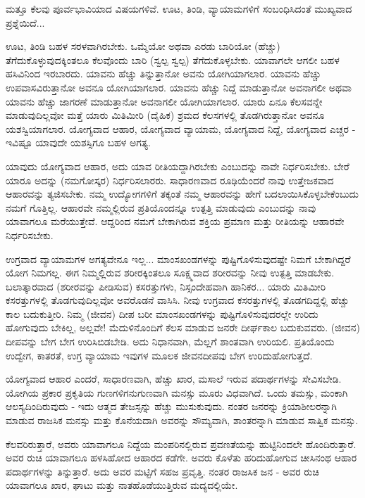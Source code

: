ಮತ್ತೂ ಕೆಲವು ಪೂರ್ವಭಾವಿಯಾದ ವಿಷಯಗಳಿವೆ. ಊಟ, ತಿಂಡಿ, ವ್ಯಾಯಾಮಗಳಿಗೆ ಸಂಬಂಧಿಸಿದಂತೆ ಮುಖ್ಯವಾದ ಪ್ರಶ್ನೆಯಿದೆ...

ಊಟ, ತಿಂಡಿ ಬಹಳ ಸರಳವಾಗಿರಬೇಕು. ಒಮ್ಮೆಯೋ ಅಥವಾ ಎರಡು ಬಾರಿಯೋ (ಹೆಚ್ಚು) ತೆಗೆದುಕೊಳ್ಳುವುದಕ್ಕಿಂತಲೂ ಕೆಲವೊಂದು ಬಾರಿ (ಸ್ವಲ್ಪ ಸ್ವಲ್ಪ) ತೆಗೆದುಕೊಳ್ಳಬೇಕು. ಯಾವಾಗಲೇ ಆಗಲೀ ಬಹಳ ಹಸಿವಿನಿಂದ ಇರಬಾರದು. ಯಾವನು ಹೆಚ್ಚು ತಿನ್ನುತ್ತಾನೋ ಅವನು ಯೋಗಿಯಾಗಲಾರ. ಯಾವನು ಹೆಚ್ಚು ಉಪವಾಸವಿರುತ್ತಾನೋ ಅವನೂ ಯೋಗಿಯಾಗಲಾರ. ಯಾವನು ಹೆಚ್ಚು ನಿದ್ದೆ ಮಾಡುತ್ತಾನೋ ಅವನಾಗಲೀ ಅಥವಾ ಯಾವನು ಹೆಚ್ಚು ಜಾಗರಣೆ ಮಾಡುತ್ತಾನೋ ಅವನಾಗಲೀ ಯೋಗಿಯಾಗಲಾರ. ಯಾರು ಏನೂ ಕೆಲಸವನ್ನೇ ಮಾಡುವುದಿಲ್ಲವೋ ಮತ್ತೆ ಯಾರು ಮಿತಿಮೀರಿ (ದೈಹಿಕ) ಶ್ರಮದ ಕೆಲಸಗಳಲ್ಲಿ ತೊಡಗಿರುತ್ತಾನೋ ಅವನೂ ಯಶಸ್ವಿಯಾಗಲಾರ. ಯೋಗ್ಯವಾದ ಆಹಾರ, ಯೋಗ್ಯವಾದ ವ್ಯಾಯಾಮ, ಯೋಗ್ಯವಾದ ನಿದ್ದೆ, ಯೋಗ್ಯವಾದ ಎಚ್ಚರ - ಇವಿಷ್ಟೂ ಯಾವುದೇ ಯಶಸ್ಸಿಗೂ ಬಹಳ ಅಗತ್ಯ.

ಯಾವುದು ಯೋಗ್ಯವಾದ ಆಹಾರ, ಅದು ಯಾವ ರೀತಿಯದ್ದಾಗಿರಬೇಕು ಎಂಬುದನ್ನು ನಾವೇ ನಿರ್ಧರಿಸಬೇಕು. ಬೇರೆ ಯಾರೂ ಅದನ್ನು (ನಮಗೋಸ್ಕರ) ನಿರ್ಧರಿಸಲಾರರು. ಸಾಧಾರಣವಾದ ರೂಢಿಯೆಂದರೆ ನಾವು ಉತ್ತೇಜಕವಾದ ಆಹಾರವನ್ನು ತ್ಯಜಿಸಬೇಕು. ನಮ್ಮ ಉದ್ಯೋಗಗಳಿಗೆ ತಕ್ಕಂತೆ ನಮ್ಮ ಆಹಾರವನ್ನು ಹೇಗೆ ಬದಲಾಯಿಸಿಕೊಳ್ಳಬೇಕೆಂಬುದು ನಮಗೆ ಗೊತ್ತಿಲ್ಲ. ಆಹಾರವೇ ನಮ್ಮಲ್ಲಿರುವ ಪ್ರತಿಯೊಂದನ್ನೂ ಉತ್ಪತ್ತಿ ಮಾಡುವುದು ಎಂಬುದನ್ನು ನಾವು ಯಾವಾಗಲೂ ಮರೆಯುತ್ತೇವೆ. ಆದ್ದರಿಂದ ನಮಗೆ ಬೇಕಾಗಿರುವ ಶಕ್ತಿಯ ಪ್ರಮಾಣ ಮತ್ತು ರೀತಿಯನ್ನು ಆಹಾರವೇ ನಿರ್ಧರಿಸಬೇಕು.

ಉಗ್ರವಾದ ವ್ಯಾಯಾಮಗಳ ಅಗತ್ಯವೇನೂ ಇಲ್ಲ... ಮಾಂಸಖಂಡಗಳನ್ನು ಪುಷ್ಟಿಗೊಳಿಸುವುದಷ್ಟೇ ನಿಮಗೆ ಬೇಕಾಗಿದ್ದರೆ ಯೋಗ ನಿಮಗಲ್ಲ. ಈಗ ನಿಮ್ಮಲ್ಲಿರುವ ಶರೀರಕ್ಕಿಂತಲೂ ಸೂಕ್ಷ್ಮವಾದ ಶರೀರವನ್ನು ನೀವು ಉತ್ಪತ್ತಿ ಮಾಡಬೇಕು. ಬಲಾತ್ಕಾರವಾದ (ಶರೀರವನ್ನು ಪೀಡಿಸುವ) ಕಸರತ್ತುಗಳು, ನಿಸ್ಸಂದೇಹವಾಗಿ ಹಾನಿಕರ... ಯಾರು ಮಿತಿಮೀರಿ ಕಸರತ್ತುಗಳಲ್ಲಿ ತೊಡಗುವುದಿಲ್ಲವೋ ಅವರೊಡನೆ ವಾಸಿಸಿ. ನೀವು ಉಗ್ರವಾದ ಕಸರತ್ತುಗಳಲ್ಲಿ ತೊಡಗದಿದ್ದಲ್ಲಿ ಹೆಚ್ಚು ಕಾಲ ಬದುಕುತ್ತೀರಿ. ನಿಮ್ಮ (ಜೀವನ) ದೀಪ ಬರೀ ಮಾಂಸಖಂಡಗಳನ್ನು ಪುಷ್ಟಿಗೊಳಿಸುವುದರಲ್ಲೇ ಉರಿದು ಹೋಗುವುದು ಬೇಕಿಲ್ಲ, ಅಲ್ಲವೇ! ಮೆದುಳಿನೊಂದಿಗೆ ಕೆಲಸ ಮಾಡುವ ಜನರೇ ದೀರ್ಘಕಾಲ ಬದುಕುವವರು. (ಜೀವನ) ದೀಪವನ್ನು ಬೇಗ ಬೇಗ ಉರಿಸಿಬಿಡಬೇಡಿ. ಅದು ನಿಧಾನವಾಗಿ, ಮೆಲ್ಲಗೆ ಶಾಂತವಾಗಿ ಉರಿಯಲಿ. ಪ್ರತಿಯೊಂದು ಉದ್ವೇಗ, ಕಾತರತೆ, ಉಗ್ರ ವ್ಯಾಯಾಮ ಇವುಗಳ ಮೂಲಕ ಜೀವನದೀಪವು ಬೇಗ ಉರಿದುಹೋಗುತ್ತದೆ.

ಯೋಗ್ಯವಾದ ಆಹಾರ ಎಂದರೆ, ಸಾಧಾರಣವಾಗಿ, ಹೆಚ್ಚು ಖಾರ, ಮಸಾಲೆ ಇರುವ ಪದಾರ್ಥಗಳನ್ನು ಸೇವಿಸಬೇಡಿ. ಯೋಗಿಯ ಪ್ರಕಾರ ಪ್ರಕೃತಿಯ ಗುಣಗಳಿಗನುಗುಣವಾಗಿ ಮನಸ್ಸು ಮೂರು ವಿಧವಾಗಿದೆ. ಒಂದು ತಮಸ್ಸು, ಮಂಕಾಗಿ ಆಲಸ್ಯದಿಂದಿರುವುದು - ಇದು ಆತ್ಮದ ತೇಜಸ್ಸನ್ನು ಹೆಚ್ಚು ಮುಸುಕುವುದು. ನಂತರ ಜನರನ್ನು ಕ್ರಿಯಾಶೀಲರನ್ನಾಗಿ ಮಾಡುವ ರಾಜಸಿಕ ಮನಸ್ಸು ಮತ್ತು ಕೊನೆಯದಾಗಿ ಅವರನ್ನು ಸೌಮ್ಯವಾಗಿ, ಶಾಂತರನ್ನಾಗಿ ಮಾಡುವ ಸಾತ್ವಿಕ ಮನಸ್ಸು.

ಕೆಲವರಿರುತ್ತಾರೆ, ಅವರು ಯಾವಾಗಲೂ ನಿದ್ದೆಯ ಮಂಪರಿನಲ್ಲಿರುವ ಪ್ರವಣತೆಯನ್ನು ಹುಟ್ಟಿನಿಂದಲೇ ಹೊಂದಿರುತ್ತಾರೆ. ಅವರ ರುಚಿ ಯಾವಾಗಲೂ ಹಳಸಿಹೋದ ಆಹಾರದ ಕಡೆಗೇ. ಅವರು ಕೊಳೆತು ಹರಿದುಹೋಗುವ ಚೀಸಿನಂಥ ಆಹಾರ ಪದಾರ್ಥಗಳನ್ನು ತಿನ್ನುತ್ತಾರೆ. ಅದು ಅವರ ಮಟ್ಟಿಗೆ ಸಹಜ ಪ್ರವೃತ್ತಿ. ನಂತರ ರಾಜಸಿಕ ಜನ - ಅವರ ರುಚಿ ಯಾವಾಗಲೂ ಖಾರ, ಘಾಟು ಮತ್ತು ನಾತಹೊಡೆಯುತ್ತಿರುವ ಮದ್ಯದಲ್ಲಿಯೇ.

